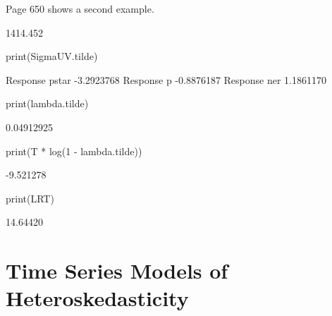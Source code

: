 \documentclass[a4paper]{article}
\begin{document}
Page 650 shows a second example.
\begin{Schunk}
\begin{Soutput}
         [,1]
[1,] 1414.452
\end{Soutput}
\begin{Sinput}
 print(SigmaUV.tilde)
\end{Sinput}
\begin{Soutput}
                     [,1]
Response pstar -3.2923768
Response p     -0.8876187
Response ner    1.1861170
\end{Soutput}
\begin{Sinput}
 print(lambda.tilde)
\end{Sinput}
\begin{Soutput}
[1] 0.04912925
\end{Soutput}
\begin{Sinput}
 print(T * log(1 - lambda.tilde))
\end{Sinput}
\begin{Soutput}
[1] -9.521278
\end{Soutput}
\begin{Sinput}
 print(LRT)
\end{Sinput}
\begin{Soutput}
[1] 14.64420
\end{Soutput}
\end{Schunk}
\section{Time Series Models of Heteroskedasticity}
\end{document}
